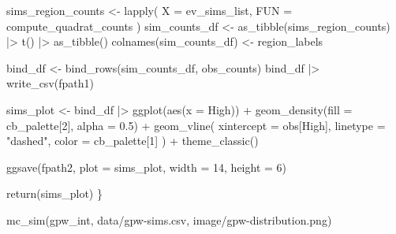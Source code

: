 \documentclass[
  letterpaper,
  DIV=11,
  numbers=noendperiod]{scrartcl}
\newenvironment{Shaded}{\begin{snugshade}}{\end{snugshade}}
\newcommand{\AttributeTok}[1]{\textcolor[rgb]{0.40,0.45,0.13}{#1}}
\newcommand{\DecValTok}[1]{\textcolor[rgb]{0.68,0.00,0.00}{#1}}
\newcommand{\FloatTok}[1]{\textcolor[rgb]{0.68,0.00,0.00}{#1}}
\newcommand{\FunctionTok}[1]{\textcolor[rgb]{0.28,0.35,0.67}{#1}}
\newcommand{\NormalTok}[1]{\textcolor[rgb]{0.00,0.23,0.31}{#1}}
\newcommand{\OtherTok}[1]{\textcolor[rgb]{0.00,0.23,0.31}{#1}}
\newcommand{\SpecialCharTok}[1]{\textcolor[rgb]{0.37,0.37,0.37}{#1}}
\newcommand{\StringTok}[1]{\textcolor[rgb]{0.13,0.47,0.30}{#1}}
\begin{document}
\begin{Shaded}
\begin{Highlighting}[]
\NormalTok{  sims\_region\_counts }\OtherTok{\textless{}{-}} \FunctionTok{lapply}\NormalTok{(}
    \AttributeTok{X =}\NormalTok{ ev\_sims\_list,}
    \AttributeTok{FUN =}\NormalTok{ compute\_quadrat\_counts}
\NormalTok{    )}
\NormalTok{  sim\_counts\_df }\OtherTok{\textless{}{-}} \FunctionTok{as\_tibble}\NormalTok{(sims\_region\_counts) }\SpecialCharTok{|\textgreater{}} \FunctionTok{t}\NormalTok{() }\SpecialCharTok{|\textgreater{}} \FunctionTok{as\_tibble}\NormalTok{()}
  \FunctionTok{colnames}\NormalTok{(sim\_counts\_df) }\OtherTok{\textless{}{-}}\NormalTok{ region\_labels}

\NormalTok{  bind\_df }\OtherTok{\textless{}{-}} \FunctionTok{bind\_rows}\NormalTok{(sim\_counts\_df, obs\_counts)}
\NormalTok{  bind\_df }\SpecialCharTok{|\textgreater{}} \FunctionTok{write\_csv}\NormalTok{(fpath1)}

\NormalTok{  sims\_plot }\OtherTok{\textless{}{-}}\NormalTok{ bind\_df }\SpecialCharTok{|\textgreater{}} 
    \FunctionTok{ggplot}\NormalTok{(}\FunctionTok{aes}\NormalTok{(}\AttributeTok{x =}\NormalTok{ High)) }\SpecialCharTok{+}
    \FunctionTok{geom\_density}\NormalTok{(}\AttributeTok{fill =}\NormalTok{ cb\_palette[}\DecValTok{2}\NormalTok{], }\AttributeTok{alpha =} \FloatTok{0.5}\NormalTok{) }\SpecialCharTok{+}
    \FunctionTok{geom\_vline}\NormalTok{(}
      \AttributeTok{xintercept =}\NormalTok{ obs[}\StringTok{\textquotesingle{}High\textquotesingle{}}\NormalTok{],}
      \AttributeTok{linetype =} \StringTok{"dashed"}\NormalTok{,}
      \AttributeTok{color =}\NormalTok{ cb\_palette[}\DecValTok{1}\NormalTok{]}
\NormalTok{      ) }\SpecialCharTok{+} 
    \FunctionTok{theme\_classic}\NormalTok{()}

  \FunctionTok{ggsave}\NormalTok{(fpath2, }\AttributeTok{plot =}\NormalTok{ sims\_plot, }\AttributeTok{width =} \DecValTok{14}\NormalTok{, }\AttributeTok{height =} \DecValTok{6}\NormalTok{)}
  
  \FunctionTok{return}\NormalTok{(sims\_plot)}
\NormalTok{\}}
\end{Highlighting}
\end{Shaded}

\begin{Shaded}
\begin{Highlighting}[]
\FunctionTok{mc\_sim}\NormalTok{(gpw\_int, }\StringTok{\textquotesingle{}data/gpw{-}sims.csv\textquotesingle{}}\NormalTok{, }\StringTok{\textquotesingle{}image/gpw{-}distribution.png\textquotesingle{}}\NormalTok{)}
\end{Highlighting}
\end{Shaded}
\end{document}
